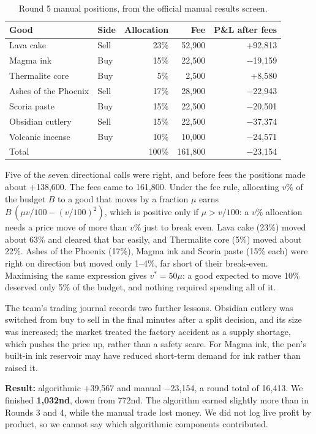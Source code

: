 \documentclass[11pt,a4paper]{article}
\begin{document}
\begin{table}[htbp]
\centering\small
\begin{tabular}{@{}l l r r r@{}}
\toprule
Good & Side & Allocation & Fee & P\&L after fees \\
\midrule
Lava cake & Sell & 23\% & 52,900 & +92,813 \\
Magma ink & Buy & 15\% & 22,500 & $-$19,159 \\
Thermalite core & Buy & 5\% & 2,500 & +8,580 \\
Ashes of the Phoenix & Sell & 17\% & 28,900 & $-$22,943 \\
Scoria paste & Buy & 15\% & 22,500 & $-$20,501 \\
Obsidian cutlery & Sell & 15\% & 22,500 & $-$37,374 \\
Volcanic incense & Buy & 10\% & 10,000 & $-$24,571 \\
\midrule
Total & & 100\% & 161,800 & $-$23,154 \\
\bottomrule
\end{tabular}
\caption{Round 5 manual positions, from the official manual results screen.}
\label{tab:r5manual}
\end{table}

Five of the seven directional calls were right, and before fees the positions made about +138,600. The fees came
to 161,800. Under the fee rule, allocating $v\%$ of the budget $B$ to a good that moves by a fraction $\mu$ earns
$B\,(\mu v/100-(v/100)^2)$, which is positive only if $\mu>v/100$: a $v\%$ allocation needs a price move of
more than $v\%$ just to break even. Lava cake (23\%) moved about 63\% and cleared that bar easily, and
Thermalite core (5\%) moved about 22\%. Ashes of the Phoenix (17\%), Magma ink and Scoria paste (15\% each)
were right on direction but moved only 1--4\%, far short of their break-even. Maximising the same expression
gives $v^\ast=50\mu$: a good expected to move 10\% deserved only 5\% of the budget, and nothing required
spending all of it.

The team's trading journal records two further lessons. Obsidian cutlery was switched from buy to sell in the
final minutes after a split decision, and its size was increased; the market treated the factory accident as a
supply shortage, which pushes the price up, rather than a safety scare. For Magma ink, the pen's built-in ink
reservoir may have reduced short-term demand for ink rather than raised it.

\textbf{Result:} algorithmic +39,567 and manual $-$23,154, a round total of 16,413. We finished \textbf{1,032nd},
down from 772nd. The algorithm earned slightly more than in Rounds 3 and 4, while the manual trade lost money. We
did not log live profit by product, so we cannot say which algorithmic components contributed.
\end{document}

